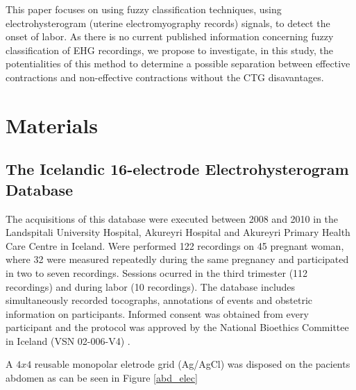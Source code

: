 \documentclass[bioengineering,article,submit,moreauthors,pdftex,10pt,a4paper]{mdpi}
\begin{document}
 This paper focuses on using fuzzy classification techniques, using electrohysterogram (uterine electromyography records) signals, to detect the onset of labor. As there is no current
 published information concerning fuzzy classification of EHG recordings, we propose to investigate, in this study, the potentialities of this method to determine a possible separation between effective
 contractions and non-effective contractions without the CTG disavantages.
 





\section{Materials}

\subsection{The Icelandic 16-electrode	Electrohysterogram Database}


The acquisitions of this database were executed between 2008 and 2010 in the Landspitali University Hospital, Akureyri Hospital and Akureyri Primary Health Care Centre in Iceland. Were performed 122 recordings on 45 pregnant woman, where 32 were measured repeatedly during
the same pregnancy and participated in two to seven recordings. Sessions ocurred in the third
trimester (112 recordings) and during labor (10 recordings). The database includes simultaneously recorded tocographs, annotations of events and obstetric information on participants. Informed consent was obtained from every participant and the protocol was approved by the National
Bioethics Committee in Iceland (VSN 02-006-V4) \cite{ref-islddatabase}.


A $4x4$ reusable monopolar eletrode grid (Ag/AgCl) was disposed on the pacients abdomen as can be seen in Figure \ref{abd_elec} 
\end{document}
